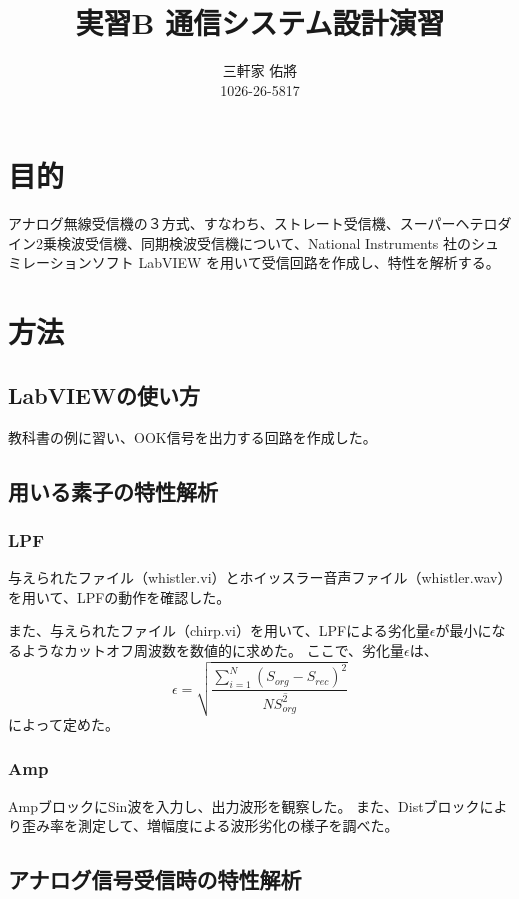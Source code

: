\documentclass[11pt]{ltjsarticle}
\title{実習B 通信システム設計演習}
\author{三軒家 佑將 \\ 1026-26-5817}
\date{}
\begin{document}
\maketitle

\section{目的}
	アナログ無線受信機の３方式、すなわち、ストレート受信機、スーパーヘテロダイン2乗検波受信機、同期検波受信機について、National Instruments 社のシュミレーションソフト LabVIEW を用いて受信回路を作成し、特性を解析する。
\section{方法}
	\subsection{LabVIEWの使い方}
		教科書の例に習い、OOK信号を出力する回路を作成した。
	\subsection{用いる素子の特性解析}
		\subsubsection{LPF}
			与えられたファイル（whistler.vi）とホイッスラー音声ファイル（whistler.wav）を用いて、LPFの動作を確認した。
			
			また、与えられたファイル（chirp.vi）を用いて、LPFによる劣化量$\epsilon$が最小になるようなカットオフ周波数を数値的に求めた。
			ここで、劣化量$\epsilon$は、
			$$
				\epsilon = \sqrt{\frac{\sum^{N}_{i=1} \left( S_{org} - S_{rec} \right)^2}{N\overline{S_{org}^{2}}}}
			$$
			によって定めた。

		\subsubsection{Amp}
			AmpブロックにSin波を入力し、出力波形を観察した。
			また、Distブロックにより歪み率を測定して、増幅度による波形劣化の様子を調べた。
	\subsection{アナログ信号受信時の特性解析}
\end{document}
